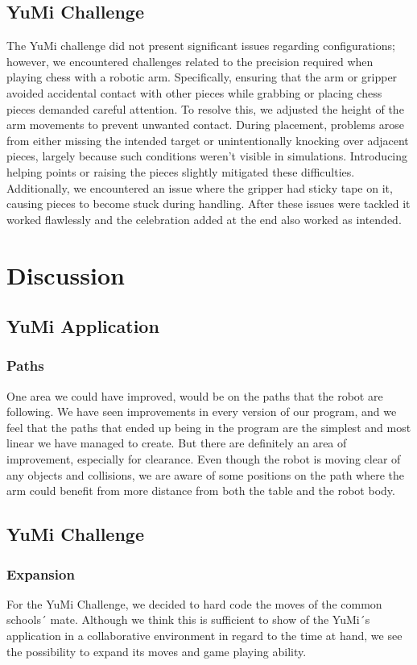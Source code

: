 \documentclass[a4paper,12pt]{article}
\begin{document}
\subsection{YuMi Challenge}
The YuMi challenge did not present significant issues regarding configurations; however, we encountered challenges related to the precision required when playing chess with a robotic arm. Specifically, ensuring that the arm or gripper avoided accidental contact with other pieces while grabbing or placing chess pieces demanded careful attention. To resolve this, we adjusted the height of the arm movements to prevent unwanted contact. During placement, problems arose from either missing the intended target or unintentionally knocking over adjacent pieces, largely because such conditions weren't visible in simulations. Introducing helping points or raising the pieces slightly mitigated these difficulties.
Additionally, we encountered an issue where the gripper had sticky tape on it, causing pieces to become stuck during handling. 
After these issues were tackled it worked flawlessly and the celebration added at the end also worked as intended.

\section{Discussion}
\subsection{YuMi Application}
\subsubsection{Paths}

One area we could have improved, would be on the paths that the robot are following. We have seen improvements in every version of our program, and we feel that the paths that ended up being in the program are the simplest and most linear we have managed to create. But there are definitely an area of improvement, especially for clearance. Even though the robot is moving clear of any objects and collisions, we are aware of some positions on the path where the arm could benefit from more distance from both the table and the robot body.

\subsection{YuMi Challenge}
\subsubsection{Expansion}
For the YuMi Challenge, we decided to hard code the moves of the common schools´ mate. Although we think this is sufficient to show of the YuMi´s application in a collaborative environment in regard to the time at hand, we see the possibility to expand its moves and game playing ability. 
\end{document}
